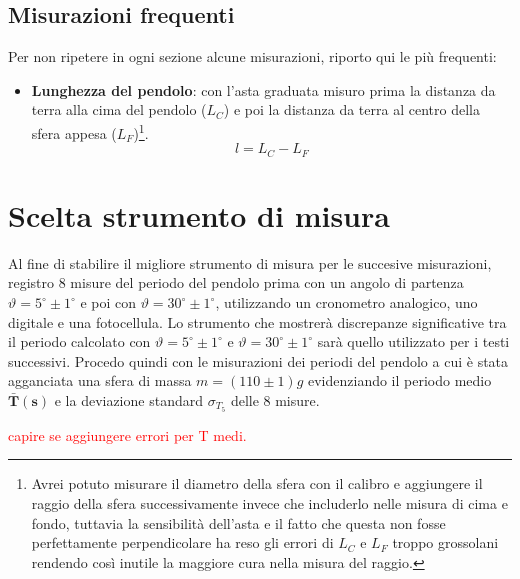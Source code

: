 \documentclass{article}
\begin{document}
	\subsection{Misurazioni frequenti}
	Per non ripetere in ogni sezione alcune misurazioni, riporto qui le più frequenti:
	
	\begin{itemize}
		\item \textbf{Lunghezza del pendolo}: con l'asta graduata misuro prima la distanza da terra alla cima del pendolo ($L_C$) e poi la distanza da terra al centro della sfera appesa ($L_F$)\footnote{Avrei potuto misurare il diametro della sfera con il calibro e aggiungere il raggio della sfera successivamente invece che includerlo nelle misura di cima e fondo, tuttavia la sensibilità dell'asta e il fatto che questa non fosse perfettamente perpendicolare ha reso gli errori di $L_C$ e $L_F$ troppo grossolani rendendo così inutile la maggiore cura nella misura del raggio.}.   \begin{equation}
			l = L_C - L_F 
		\end{equation} 
	\end{itemize}
	
	
	
	
	
	
	
	\newpage
	\section{Scelta strumento di misura}
	
	Al fine di stabilire il migliore strumento di misura per le succesive misurazioni, registro 8 misure del periodo del pendolo prima con un angolo di partenza $\vartheta = 5^\circ \pm1^\circ$ e poi con $\vartheta = 30^\circ\pm1^\circ$, utilizzando un cronometro analogico, uno digitale e una fotocellula. Lo strumento che mostrerà discrepanze significative tra il periodo calcolato con $\vartheta = 5^\circ\pm1^\circ$ e $\vartheta = 30^\circ\pm1^\circ$ sarà quello utilizzato per i testi successivi. Procedo quindi con le misurazioni dei periodi del pendolo a cui è stata agganciata una sfera di massa $m = (110 \pm 1)g$ evidenziando il periodo medio $\mathbf{\bar{T}(s)}$ e la deviazione standard $\sigma_{T_{5}}$ delle 8 misure. 
	
	\textcolor{red}{capire se aggiungere errori per T medi.}
	
\end{document}
